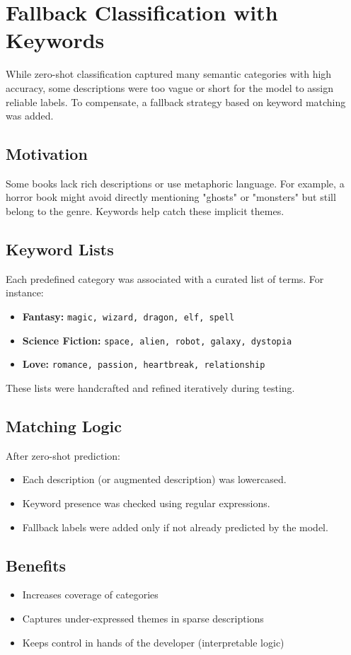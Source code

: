 \chapter{Fallback Classification with Keywords}
\label{appendix:keyword-fallback}

While zero-shot classification captured many semantic categories with high accuracy, some descriptions were too vague or short for the model to assign reliable labels. To compensate, a fallback strategy based on keyword matching was added.

\section*{Motivation}
Some books lack rich descriptions or use metaphoric language. For example, a horror book might avoid directly mentioning "ghosts" or "monsters" but still belong to the genre. Keywords help catch these implicit themes.

\section*{Keyword Lists}
Each predefined category was associated with a curated list of terms. For instance:
\begin{itemize}
  \item \textbf{Fantasy:} \texttt{magic, wizard, dragon, elf, spell}
  \item \textbf{Science Fiction:} \texttt{space, alien, robot, galaxy, dystopia}
  \item \textbf{Love:} \texttt{romance, passion, heartbreak, relationship}
\end{itemize}

These lists were handcrafted and refined iteratively during testing.

\section*{Matching Logic}
After zero-shot prediction:
\begin{itemize}
  \item Each description (or augmented description) was lowercased.
  \item Keyword presence was checked using regular expressions.
  \item Fallback labels were added only if not already predicted by the model.
\end{itemize}

\section*{Benefits}
\begin{itemize}
  \item Increases coverage of categories
  \item Captures under-expressed themes in sparse descriptions
  \item Keeps control in hands of the developer (interpretable logic)
\end{itemize}

